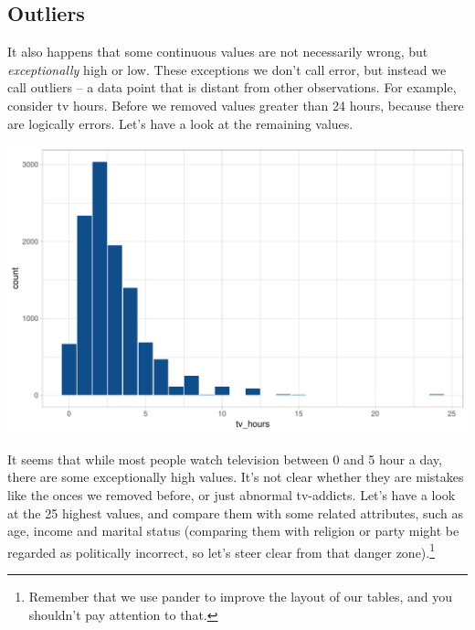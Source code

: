 \documentclass[]{tufte-book}
\newenvironment{Shaded}{}{}
\newcommand{\KeywordTok}[1]{\textcolor[rgb]{0.00,0.44,0.13}{\textbf{#1}}}
\newcommand{\DataTypeTok}[1]{\textcolor[rgb]{0.56,0.13,0.00}{#1}}
\newcommand{\DecValTok}[1]{\textcolor[rgb]{0.25,0.63,0.44}{#1}}
\newcommand{\StringTok}[1]{\textcolor[rgb]{0.25,0.44,0.63}{#1}}
\newcommand{\OperatorTok}[1]{\textcolor[rgb]{0.40,0.40,0.40}{#1}}
\newcommand{\NormalTok}[1]{#1}
\begin{document}
\subsection{Outliers}\label{outliers}

It also happens that some continuous values are not necessarily wrong,
but \emph{exceptionally} high or low. These exceptions we don't call
error, but instead we call outliers -- a data point that is distant from
other observations. For example, consider tv hours. Before we removed
values greater than 24 hours, because there are logically errors. Let's
have a look at the remaining values.

\begin{Shaded}
\end{Shaded}

\includegraphics{cleaning_tutorial_files/figure-latex/unnamed-chunk-37-1}

It seems that while most people watch television between 0 and 5 hour a
day, there are some exceptionally high values. It's not clear whether
they are mistakes like the onces we removed before, or just abnormal
tv-addicts. Let's have a look at the 25 highest values, and compare them
with some related attributes, such as age, income and marital status
(comparing them with religion or party might be regarded as politically
incorrect, so let's steer clear from that danger zone).\footnote{Remember
  that we use pander to improve the layout of our tables, and you
  shouldn't pay attention to that.}
\end{document}
